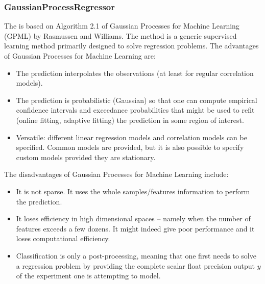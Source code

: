 \subsubsection{GaussianProcessRegressor}
  The  is based on Algorithm 2.1 of Gaussian Processes
  for Machine Learning (GPML) by Rasmussen and Williams. The method is a generic supervised learning
  method primarily designed to solve regression problems.                          The advantages of
  Gaussian Processes for Machine Learning are:                          \begin{itemize}
  \item The prediction interpolates the observations (at least for regular
  correlation models).                            \item The prediction is probabilistic (Gaussian)
  so that one can compute                            empirical confidence intervals and exceedance
  probabilities that might be used                            to refit (online fitting, adaptive
  fitting) the prediction in some region of                            interest.
  \item Versatile: different linear regression models and correlation models can
  be specified.                            Common models are provided, but it is also possible to
  specify custom models                            provided they are stationary.
  \end{itemize}                          The disadvantages of Gaussian Processes for Machine
  Learning include:                          \begin{itemize}                            \item It is
  not sparse.                            It uses the whole samples/features information to perform
  the prediction.                            \item It loses efficiency in high dimensional spaces –
  namely when the                            number of features exceeds a few dozens.
  It might indeed give poor performance and it loses computational efficiency.
  \item Classification is only a post-processing, meaning that one first needs
  to solve a regression problem by providing the complete scalar float precision
  output $y$ of the experiment one is attempting to model.                          \end{itemize}

